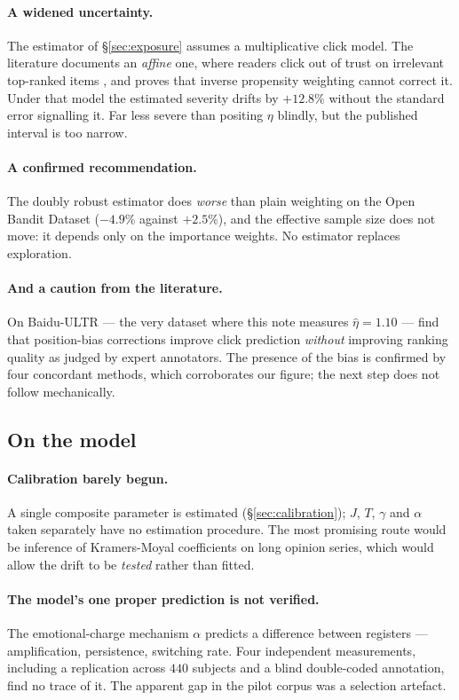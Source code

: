 \documentclass[11pt,a4paper]{article}
\begin{document}
\paragraph{A widened uncertainty.} The estimator of \S\ref{sec:exposure} assumes a multiplicative
click model. The literature documents an \emph{affine} one, where readers click out of trust on
irrelevant top-ranked items \citep{vardasbi2020}, and proves that inverse propensity weighting
cannot correct it. Under that model the estimated severity drifts by $+12.8\%$ without the
standard error signalling it. Far less severe than positing $\eta$ blindly, but the published
interval is too narrow.

\paragraph{A confirmed recommendation.} The doubly robust estimator does \emph{worse} than plain
weighting on the Open Bandit Dataset ($-4.9\%$ against $+2.5\%$), and the effective sample size
does not move: it depends only on the importance weights. No estimator replaces exploration.

\paragraph{And a caution from the literature.} On Baidu-ULTR --- the very dataset where this note
measures $\hat\eta = 1.10$ --- \citet{hager2024} find that position-bias corrections improve click
prediction \emph{without} improving ranking quality as judged by expert annotators. The presence
of the bias is confirmed by four concordant methods, which corroborates our figure; the next step
does not follow mechanically.

\subsection{On the model}

\paragraph{Calibration barely begun.} A single composite parameter is estimated
(\S\ref{sec:calibration}); $J$, $T$, $\gamma$ and $\alpha$ taken separately have no estimation
procedure. The most promising route would be inference of Kramers-Moyal coefficients on long
opinion series, which would allow the drift to be \emph{tested} rather than fitted.

\paragraph{The model's one proper prediction is not verified.} The emotional-charge mechanism
$\alpha$ predicts a difference between registers --- amplification, persistence, switching rate.
Four independent measurements, including a replication across $440$ subjects and a blind
double-coded annotation, find no trace of it. The apparent gap in the pilot corpus was a
selection artefact.
\end{document}

